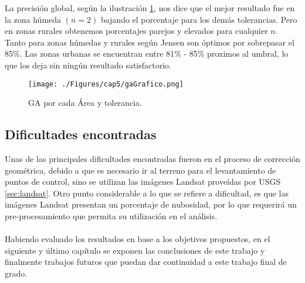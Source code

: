 La precisi\'on global, seg\'un la ilustraci\'on \ref{fig:gaGrafico}, nos dice que el mejor resultado fue en la zona h\'umeda $ (n=2) $ bajando el porcentaje para los dem\'as tolerancias. Pero en zonas rurales obtenemos porcentajes parejos y elevados para cualquier $ n $. Tanto para zonas h\'umedas y rurales seg\'un Jensen \cite{jensen1981urban} son \'optimos por sobrepasar el 85\%. Las zonas urbanas se encuentran entre 81\% - 85\% proximos al umbral, lo que los deja sin ning\'un resultado satisfactorio.
\begin{figure}[H]
	\centering
	\texttt{[image: ./Figures/cap5/gaGrafico.png]}
	\caption{GA por cada \'Area y tolerancia.}
	\label{fig:gaGrafico}
\end{figure}

\subsection{Dificultades encontradas} 
Unas de las principales dificultades encontradas fueron en el proceso de correcci\'on geom\'etrica, debido a que es necesario ir al terreno para el levantamiento de puntos de control, sino se utilizan las im\'agenes Landsat prove\'idas por USGS \ref{sec:landsat}. Otro punto considerable a lo que se refiere a dificultad, es que las im\'agenes Landsat presentan un porcentaje de nubosidad, por lo que requerir\'a un pre-procesamiento que permita su utilizaci\'on en el an\'alisis.\\~\\

Habiendo evaluado los resultados en base a los objetivos propuestos, en el siguiente y \'ultimo cap\'itulo se exponen las conclusiones de este trabajo  y finalmente trabajos futuros que puedan dar continuidad a este trabajo final de grado.